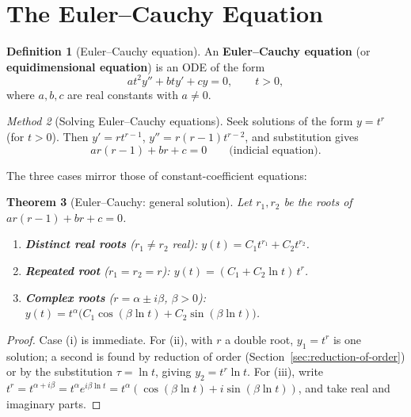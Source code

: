 \documentclass[12pt,a4paper,openany]{book}
\theoremstyle{definition}
\newtheorem{definition}{Definition}[chapter]
\theoremstyle{plain}
\newtheorem{theorem}[definition]{Theorem}
\theoremstyle{remark}
\newtheorem{method}[definition]{Method}
\begin{document}
\section{The Euler--Cauchy Equation}\label{sec:euler-cauchy}

\begin{definition}[Euler--Cauchy equation]\label{def:euler-cauchy}
An \textbf{Euler--Cauchy equation} (or \textbf{equidimensional equation}) is
an ODE of the form
\begin{equation}\label{eq:euler-cauchy}
  at^2 y'' + bt y' + cy = 0, \qquad t > 0,
\end{equation}
where $a, b, c$ are real constants with $a \ne 0$.
\end{definition}

\begin{method}[Solving Euler--Cauchy equations]\label{meth:euler-cauchy}
Seek solutions of the form $y = t^r$ (for $t > 0$). Then $y' = rt^{r-1}$,
$y'' = r(r-1)t^{r-2}$, and substitution gives
\[
  a r(r-1) + br + c = 0 \qquad\text{(indicial equation).}
\]
\end{method}

The three cases mirror those of constant-coefficient equations:

\begin{theorem}[Euler--Cauchy: general solution]\label{thm:euler-cauchy-sol}
Let $r_1, r_2$ be the roots of $ar(r-1) + br + c = 0$.
\begin{enumerate}[label=(\roman*)]
  \item \textbf{Distinct real roots} ($r_1 \ne r_2$ real):
    $y(t) = C_1 t^{r_1} + C_2 t^{r_2}$.
  \item \textbf{Repeated root} ($r_1 = r_2 = r$):
    $y(t) = (C_1 + C_2\ln t)\,t^r$.
  \item \textbf{Complex roots} ($r = \alpha \pm i\beta$, $\beta > 0$):
    $y(t) = t^\alpha\bigl(C_1\cos(\beta\ln t) + C_2\sin(\beta\ln t)\bigr)$.
\end{enumerate}
\end{theorem}

\begin{proof}
Case (i) is immediate. For (ii), with $r$ a double root, $y_1 = t^r$ is one
solution; a second is found by reduction of order
(Section~\ref{sec:reduction-of-order}) or by the substitution $\tau = \ln t$,
giving $y_2 = t^r \ln t$. For (iii), write $t^r = t^{\alpha + i\beta}
= t^\alpha e^{i\beta\ln t} = t^\alpha(\cos(\beta\ln t) + i\sin(\beta\ln t))$,
and take real and imaginary parts.
\end{proof}
\end{document}
